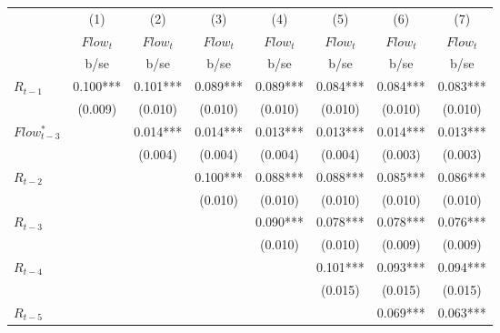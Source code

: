 {
\def\sym#1{\ifmmode^{#1}\else\(^{#1}\)\fi}
\begin{tabular}{l*{7}{c}}
\hline\hline
            &\multicolumn{1}{c}{(1)}&\multicolumn{1}{c}{(2)}&\multicolumn{1}{c}{(3)}&\multicolumn{1}{c}{(4)}&\multicolumn{1}{c}{(5)}&\multicolumn{1}{c}{(6)}&\multicolumn{1}{c}{(7)}\\
            &\multicolumn{1}{c}{$Flow_{t}$}&\multicolumn{1}{c}{$Flow_{t}$}&\multicolumn{1}{c}{$Flow_{t}$}&\multicolumn{1}{c}{$Flow_{t}$}&\multicolumn{1}{c}{$Flow_{t}$}&\multicolumn{1}{c}{$Flow_{t}$}&\multicolumn{1}{c}{$Flow_{t}$}\\
            &        b/se   &        b/se   &        b/se   &        b/se   &        b/se   &        b/se   &        b/se   \\
\hline
$R_{t-1}$ &       0.100***&       0.101***&       0.089***&       0.089***&       0.084***&       0.084***&       0.083***\\[-0.2cm]
            &     (0.009)   &     (0.010)   &     (0.010)   &     (0.010)   &     (0.010)   &     (0.010)   &     (0.010)   \\
[1em]
$Flow^*_{t-3}$&               &       0.014***&       0.014***&       0.013***&       0.013***&       0.014***&       0.013***\\[-0.2cm]
            &               &     (0.004)   &     (0.004)   &     (0.004)   &     (0.004)   &     (0.003)   &     (0.003)   \\
[1em]
$R_{t-2}$&               &               &       0.100***&       0.088***&       0.088***&       0.085***&       0.086***\\[-0.2cm]
            &               &               &     (0.010)   &     (0.010)   &     (0.010)   &     (0.010)   &     (0.010)   \\
[1em]
$R_{t-3}$&               &               &               &       0.090***&       0.078***&       0.078***&       0.076***\\[-0.2cm]
            &               &               &               &     (0.010)   &     (0.010)   &     (0.009)   &     (0.009)   \\
[1em]
$R_{t-4}$&               &               &               &               &       0.101***&       0.093***&       0.094***\\[-0.2cm]
            &               &               &               &               &     (0.015)   &     (0.015)   &     (0.015)   \\
[1em]
$R_{t-5}$&               &               &               &               &               &       0.069***&       0.063***\\[-0.2cm]

\end{tabular}}
